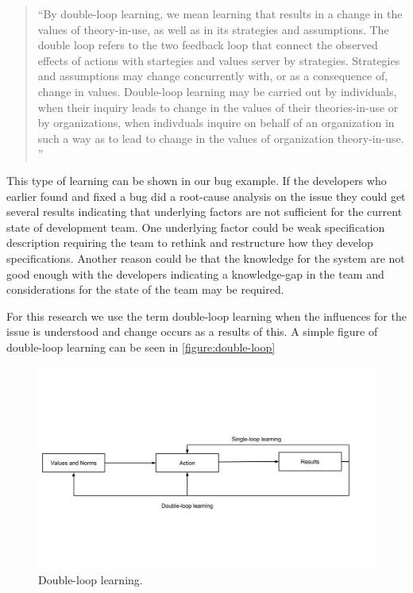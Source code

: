 \begin{quote}
``By double-loop learning, we mean learning that results in a change in the values of theory-in-use, as well as in its strategies and assumptions. The double loop refers to the two feedback loop that connect the observed effects of actions with startegies and values server by strategies. Strategies and assumptions may change concurrently with, or as a consequence of, change in values. Double-loop learning may be carried out by individuals, when their inquiry leads to change in the values of their theories-in-use or by organizations, when indivduals inquire on behalf of an organization in such a way as to lead to change in the values of organization theory-in-use. ''
\end{quote}

This type of learning can be shown in our bug example. If the developers who earlier found and fixed a bug did a root-cause analysis on the issue they could get several results indicating that underlying factors are not sufficient for the current state of development team. One underlying factor could be weak specification description requiring the team to rethink and restructure how they develop specifications. Another reason could be that the knowledge for the system are not good enough with the developers indicating a knowledge-gap in the team and considerations for the state of the team may be required. 

For this research we use the term double-loop learning when the influences for the issue is understood and change occurs as a results of this. A simple figure of double-loop learning can be seen in \autoref{figure:double-loop}

\begin{figure}[!h]
	\centering
	\includegraphics[width=\textwidth, keepaspectratio]{figures/double-loop.png}
	\caption{Double-loop learning.}
	\label{figure:double-loop}
\end{figure}

